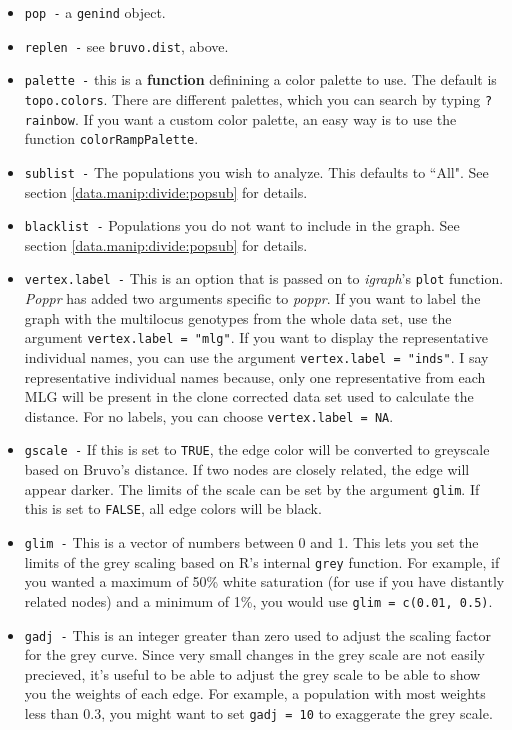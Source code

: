 \documentclass[letterpaper]{article}
\begin{document}
\begin{itemize}
  \item \texttt{pop -} a \texttt{genind} object.
  \item \texttt{replen -} see \texttt{bruvo.dist}, above.
  \item \texttt{palette -} this is a \textbf{function} definining a color palette to use. The default is \texttt{topo.colors}. There are different palettes, which you can search by typing \texttt{?rainbow}. If you want a custom color palette, an easy way is to use the function \texttt{colorRampPalette}.
  \item \texttt{sublist -} The populations you wish to analyze. This defaults to ``All". See section \ref{data.manip:divide:popsub} for details.
  \item \texttt{blacklist -} Populations you do not want to include in the graph. See section \ref{data.manip:divide:popsub} for details.
  \item \texttt{vertex.label -} This is an option that is passed on to \textit{igraph}'s \texttt{plot} function. \textit{Poppr} has added two arguments specific to \textit{poppr}. If you want to label the graph with the multilocus genotypes from the whole data set, use the argument \texttt{vertex.label = "mlg"}. If you want to display the representative individual names, you can use the argument \texttt{vertex.label = "inds"}. I say representative individual names because, only one representative from each MLG will be present in the clone corrected data set used to calculate the distance. For no labels, you can choose \texttt{vertex.label = NA}. 
  \item \texttt{gscale -} If this is set to \texttt{TRUE}, the edge color will be converted to greyscale based on Bruvo's distance. If two nodes are closely related, the edge will appear darker. The limits of the scale can be set by the argument \texttt{glim}. If this is set to \texttt{FALSE}, all edge colors will be black. 
  \item \texttt{glim -} This is a vector of numbers between 0 and 1. This lets you set the limits of the grey scaling based on R's internal \texttt{grey} function. For example, if you wanted a maximum of 50\% white saturation (for use if you have distantly related nodes) and a minimum of 1\%, you would use \texttt{glim = c(0.01, 0.5)}. 
  \item \texttt{gadj -} This is an integer greater than zero used to adjust the scaling factor for the grey curve. Since very small changes in the grey scale are not easily precieved, it's useful to be able to adjust the grey scale to be able to show you the weights of each edge. For example, a population with most weights less than 0.3, you might want to set \texttt{gadj = 10} to exaggerate the grey scale. 

\end{itemize}
\end{document}
